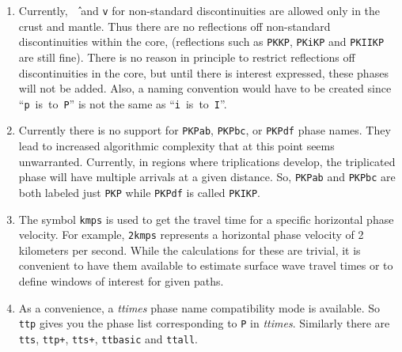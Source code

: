 \begin{enumerate}
\item 
Currently, \texttt{\^\,} and \texttt{v} for non-standard
discontinuities are allowed only in 
the crust and mantle. Thus there are no reflections off non-standard
discontinuities within the core, (reflections such as \texttt{PKKP}, 
\texttt{PKiKP} and \texttt{PKIIKP} are
still fine). 
There is no 
reason in principle to restrict reflections off discontinuities in the
core, but until there is interest expressed, these phases will not be added.
Also, a naming convention would have to be created since 
``\texttt{p}~is~to~\texttt{P}'' is not the same as 
``\texttt{i}~is~to~\texttt{I}''.

\item Currently there is no support for \texttt{PKPab}, \texttt{PKPbc}, 
or \texttt{PKPdf} phase names. 
They lead to increased algorithmic complexity that at this point seems 
unwarranted.
Currently, in regions where triplications develop, the triplicated phase will have multiple
arrivals at a given distance.
So, \texttt{PKPab} and \texttt{PKPbc} are
both labeled just \texttt{PKP} while \texttt{PKPdf} is called \texttt{PKIKP}.

\item \label{kmps} 
The symbol \texttt{kmps} is used to get the travel time for a
specific horizontal phase velocity.  
For example, \texttt{2kmps} represents a horizontal phase
velocity of 2 kilometers per second. 
While the calculations for these are trivial, it is convenient
to have them available to estimate surface wave travel times or to define windows of
interest for given paths.

\item As a convenience, a \textit{ttimes} phase name compatibility mode is available. 
So \texttt{ttp} gives
you the phase list corresponding to \texttt{P} in \textit{ttimes}. 
Similarly there are \texttt{tts}, \texttt{ttp+}, 
\texttt{tts+}, \texttt{ttbasic} and \texttt{ttall}.

\end{enumerate}
